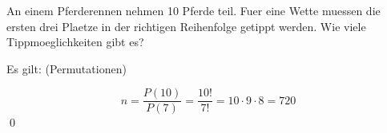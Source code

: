 \documentclass{abgabe}
\begin{document}
\begin{questions}
    \question
    An einem Pferderennen nehmen 10 Pferde teil. 
    Fuer eine Wette muessen die ersten drei Plaetze in der richtigen Reihenfolge getippt werden. 
    Wie viele Tippmoeglichkeiten gibt es?
    \begin{solution}
        Es gilt: (Permutationen)

        \[ 
            n = \frac{P(10)}{P(7)} = \frac{10!}{7!} = 10 \cdot 9 \cdot 8 = 720
        \] 
        \qed
    \end{solution}
\end{questions}
\end{document}
